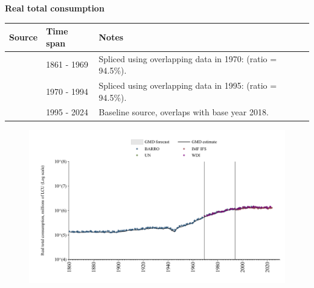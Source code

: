 \documentclass[12pt,a4paper,landscape]{article}
\begin{document}
\begin{adjustbox}{max totalsize={\paperwidth}{\paperheight},center}
\begin{minipage}[t][\textheight][t]{\textwidth}
\vspace*{0.5cm}
{}
\begin{center}
{\Large\bfseries Real total consumption}
\end{center}
\vspace{0.5cm}
\begin{table}[H]
\centering
\small
\begin{tabular}{|l|l|l|}
\hline
\textbf{Source} & \textbf{Time span} & \textbf{Notes} \\
\hline
\rowcolor{white}\cite{BARRO}& 1861 - 1969 &Spliced using overlapping data in 1970: (ratio = 94.5\%). \\
\rowcolor{lightgray}\cite{WDI}& 1970 - 1994 &Spliced using overlapping data in 1995: (ratio = 94.5\%). \\
\rowcolor{white}\cite{IMF_IFS}& 1995 - 2024 &Baseline source, overlaps with base year 2018. \\
\hline
\end{tabular}
\end{table}
\begin{figure}[H]
\centering
\includegraphics[width=\textwidth,height=0.6\textheight,keepaspectratio]{graphs/ITA_rcons.pdf}
\end{figure}
\end{minipage}
\end{adjustbox}
\end{document}
